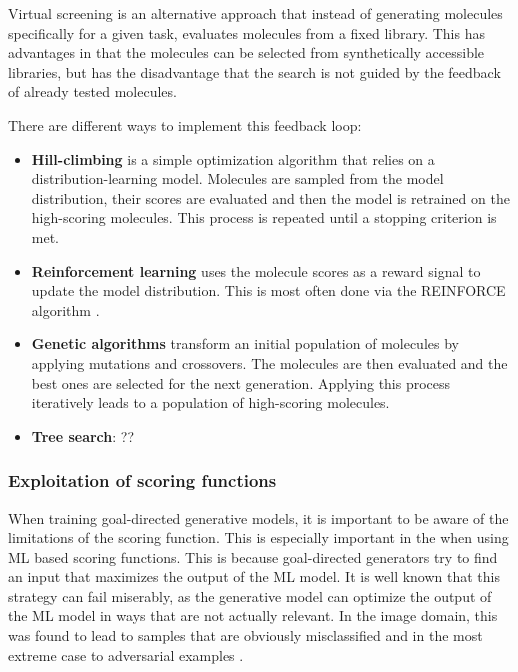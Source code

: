 Virtual screening is an alternative approach that instead of generating molecules specifically for a
given task, evaluates molecules from a fixed library. This has advantages in that the molecules can
be selected from synthetically accessible libraries, but has the disadvantage that the search is not
guided by the feedback of already tested molecules.

There are different ways to implement this feedback loop:
\begin{itemize}
      \item \textbf{Hill-climbing} is a simple optimization algorithm that relies on a
            distribution-learning model. Molecules are sampled from the model distribution, their scores are
            evaluated and then the model is retrained on the high-scoring molecules. This process is
            repeated until a stopping criterion is met.
      \item \textbf{Reinforcement learning} uses the molecule scores as a reward signal to update the
            model distribution. This is most often done via the REINFORCE algorithm
            \citep{williamsSimpleStatisticalGradientfollowing1992}.
      \item \textbf{Genetic algorithms} transform an initial population of molecules by applying
            mutations and crossovers. The molecules are then evaluated and the best ones are selected for
            the next generation. Applying this process iteratively leads to a population of high-scoring
            molecules.
      \item \textbf{Tree search}: ??
\end{itemize}


\subsubsection{Exploitation of scoring functions}
When training goal-directed generative models, it is important to be aware of the limitations of the
scoring function. This is especially important in the when using \ac{ML} based scoring functions.
This is because goal-directed generators try to find an input that maximizes the output of the
\ac{ML} model. It is well known that this strategy can fail miserably, as the generative model can
optimize the output of the \ac{ML} model in ways that are not actually relevant. In the image
domain, this was found to lead to samples that are obviously misclassified and in the most extreme
case to adversarial examples \citep{todo}. %

